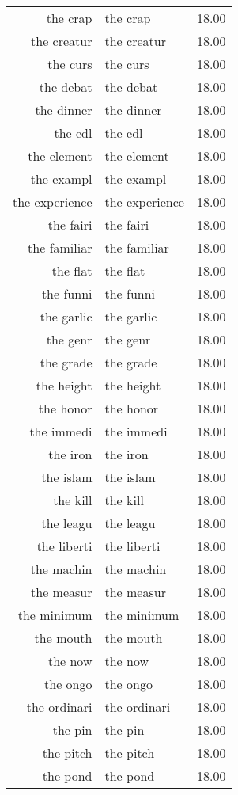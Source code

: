 \begin{table}[ht]
\begin{tabular}{rlr}
  the crap & the crap & 18.00 \\ 
  the creatur & the creatur & 18.00 \\ 
  the curs & the curs & 18.00 \\ 
  the debat & the debat & 18.00 \\ 
  the dinner & the dinner & 18.00 \\ 
  the edl & the edl & 18.00 \\ 
  the element & the element & 18.00 \\ 
  the exampl & the exampl & 18.00 \\ 
  the experience & the experience & 18.00 \\ 
  the fairi & the fairi & 18.00 \\ 
  the familiar & the familiar & 18.00 \\ 
  the flat & the flat & 18.00 \\ 
  the funni & the funni & 18.00 \\ 
  the garlic & the garlic & 18.00 \\ 
  the genr & the genr & 18.00 \\ 
  the grade & the grade & 18.00 \\ 
  the height & the height & 18.00 \\ 
  the honor & the honor & 18.00 \\ 
  the immedi & the immedi & 18.00 \\ 
  the iron & the iron & 18.00 \\ 
  the islam & the islam & 18.00 \\ 
  the kill & the kill & 18.00 \\ 
  the leagu & the leagu & 18.00 \\ 
  the liberti & the liberti & 18.00 \\ 
  the machin & the machin & 18.00 \\ 
  the measur & the measur & 18.00 \\ 
  the minimum & the minimum & 18.00 \\ 
  the mouth & the mouth & 18.00 \\ 
  the now & the now & 18.00 \\ 
  the ongo & the ongo & 18.00 \\ 
  the ordinari & the ordinari & 18.00 \\ 
  the pin & the pin & 18.00 \\ 
  the pitch & the pitch & 18.00 \\ 
  the pond & the pond & 18.00 \\ 

\end{tabular}
\end{table}
